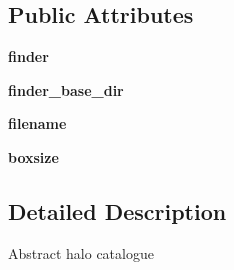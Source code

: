 \subsection*{Public Attributes}
\begin{DoxyCompactItemize}
\item 
\hypertarget{classseren3_1_1halos_1_1HaloCatalogue_abd9b2b482f37992e5b87defcc1f47e49}{
{\bfseries finder}}
\label{classseren3_1_1halos_1_1HaloCatalogue_abd9b2b482f37992e5b87defcc1f47e49}

\item 
\hypertarget{classseren3_1_1halos_1_1HaloCatalogue_ad65adf357d8a8f03dfde855353f4afb9}{
{\bfseries finder\_\-base\_\-dir}}
\label{classseren3_1_1halos_1_1HaloCatalogue_ad65adf357d8a8f03dfde855353f4afb9}

\item 
\hypertarget{classseren3_1_1halos_1_1HaloCatalogue_aa666c8f6fae113ab5481c1ea931150c2}{
{\bfseries filename}}
\label{classseren3_1_1halos_1_1HaloCatalogue_aa666c8f6fae113ab5481c1ea931150c2}

\item 
\hypertarget{classseren3_1_1halos_1_1HaloCatalogue_ae0495050c2d53b39ce0dc5c98f1529f6}{
{\bfseries boxsize}}
\label{classseren3_1_1halos_1_1HaloCatalogue_ae0495050c2d53b39ce0dc5c98f1529f6}

\end{DoxyCompactItemize}


\subsection{Detailed Description}
\begin{DoxyVerb}
Abstract halo catalogue
\end{DoxyVerb}
 


